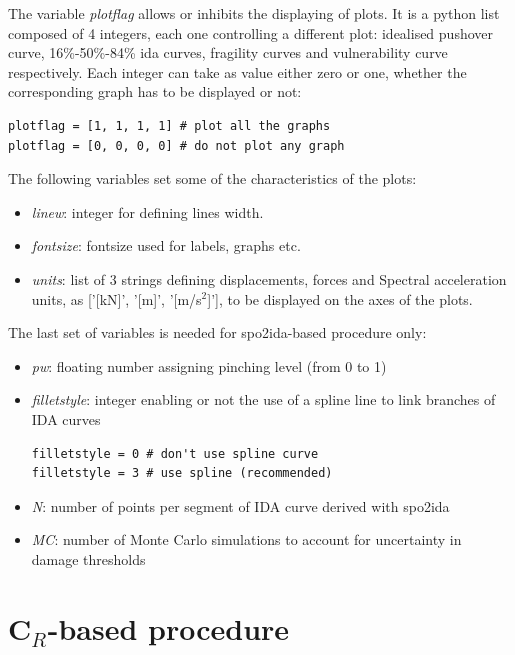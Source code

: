 The variable \textit{plotflag} allows or inhibits the displaying of plots. It is a python list composed of 4 integers, each one controlling a different plot: idealised pushover curve, 16\%-50\%-84\% ida curves, fragility curves and vulnerability curve respectively. Each integer can take as value either zero or one, whether the corresponding graph has to be displayed or not:

\begin{Verbatim}[frame=single, commandchars=\\\{\}, samepage=true]
plotflag = [1, 1, 1, 1] # plot all the graphs
plotflag = [0, 0, 0, 0] # do not plot any graph
\end{Verbatim}

The following variables set some of the characteristics of the plots:

\begin{itemize}
\item \textit{linew}: integer for defining lines width.
\item \textit{fontsize}: fontsize used for labels, graphs etc.
\item \textit{units}: list of 3 strings defining displacements, forces and Spectral acceleration units, as ['[kN]', '[m]', '[m/s$^2$]'], to be displayed on the axes of the plots.
\end{itemize}

The last set of variables is needed for spo2ida-based procedure only:

\begin{itemize}
\item \textit{pw}: floating number assigning pinching level (from 0 to 1)
\item \textit{filletstyle}: integer enabling or not the use of a spline line to link branches of IDA curves

\begin{Verbatim}[frame=single, commandchars=\\\{\}, samepage=true]
filletstyle = 0 # don't use spline curve
filletstyle = 3 # use spline (recommended)
\end{Verbatim}

\item \textit{N}: number of points per segment of IDA curve derived with spo2ida
\item \textit{MC}: number of Monte Carlo simulations to account for uncertainty in damage thresholds
\end{itemize}

\section{C$_R$-based procedure}
\label{sec:CR}
